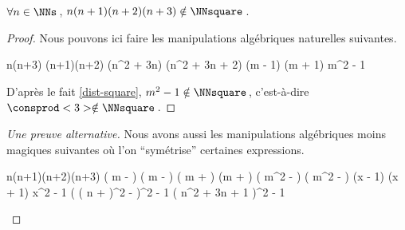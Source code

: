 \begin{fact} \label{case-3}
	 $\forall n \in \NNs$\,, $n(n+1)(n+2)(n+3) \notin \NNsquare$\,.
\end{fact}




\begin{proof}
    Nous pouvons ici faire les manipulations algébriques naturelles suivantes.
    
    \medskip
    
    \begin{stepcalc}[style = sar]
    \explnext{}
    	n(n+3) \cdot (n+1)(n+2)
    \explnext{}
    	(n^2 + 3n) \cdot (n^2 + 3n + 2)
    	(m - 1) (m + 1)
    \explnext{}
    	m^2 - 1
    \end{stepcalc}
    
    \medskip
    
    D'après le fait \ref{dist-square}, $m^2 - 1 \notin \NNsquare$\,, c'est-à-dire $\consprod<3> \notin \NNsquare$\,. 
\end{proof}




\begin{proof}[Une preuve alternative]
    Nous avons aussi les manipulations algébriques moins magiques suivantes où l'on \enquote{symétrise} certaines expressions.
    
    \medskip
    
    \begin{stepcalc}[style = sar]
    \explnext{}
    	n(n+1)(n+2)(n+3)
    	\big( m -  \big) \big( m -  \big) \big( m +  \big) \big(m +  \big)
    \explnext{}
    	\big( m^2 -  \big) \big( m^2 -  \big)
    	(x - 1) (x + 1)
    \explnext{}
    	x^2 - 1
    \explnext{}
    	\Big( \big( n +  \big)^2 -  \Big)^2 - 1
    \explnext{}
    	\big( n^2 + 3n + 1 \big)^2 - 1
    \end{stepcalc}

	\vspace{-2ex}	
	\leavevmode
\end{proof}







